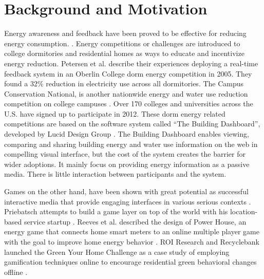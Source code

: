\documentclass{acm_proc_article-sp}
\begin{document}
\section{Background and Motivation}
%

Energy awareness and feedback have been proved to be effective for reducing energy consumption. \cite{darby-review-2006}. Energy competitions or challenges are introduced to college dormitories and residential homes as ways to educate and incentivize energy reduction. Petersen et al. describe their experiences deploying a real-time feedback
system in an Oberlin College dorm energy competition in 2005\cite{petersen-dorm-energy-reduction}. They found a 32\% reduction in electricity use across all dormitories. The Campus Conservation National, is another nationwide energy and water use reduction competition on college campuses \cite{competetoreduce}. Over 170 colleges and universities across the U.S. have signed up to participate in 2012. These dorm energy related competitions are based on the software system called ``The Building Dashboard'', developed by Lucid Design Group \cite{building-dashboard}. The Building Dashboard enables viewing, comparing and sharing building energy and water use information on the web in compelling visual interface, but the cost of the system creates the barrier for wider adoptions. It mainly focus on providing energy information as a passive media. There is little interaction between participants and the system.

Games on the other hand, have been shown with great potential as successful interactive media that provide engaging interfaces in various serious contexts \cite{mcgonigal2011reality}. Priebatsch attempts to build a game layer on top of the world with his location-based service startup \cite{Priebatsch2010ted}. Reeves et al. described the design of Power House, an energy game that connects home smart meters to an online multiple player game with the goal to improve home energy behavior \cite{Reeves2011powerhouse}.  ROI Research and Recyclebank launched the Green Your Home Challenge as a case study of employing gamification techniques online to encourage residential green behavioral changes offline \cite{gamingforgood}. 
\end{document}
